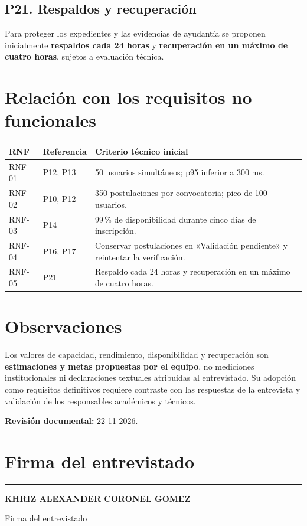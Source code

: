 \documentclass[12pt,a4paper]{article}
\begin{document}
\subsection{P21. Respaldos y recuperación}
Para proteger los expedientes y las evidencias de ayudantía se proponen inicialmente \textbf{respaldos cada 24 horas} y \textbf{recuperación en un máximo de cuatro horas}, sujetos a evaluación técnica.

\section{Relación con los requisitos no funcionales}
\noindent\begin{tabularx}{\textwidth}{@{}p{1.5cm}p{2.6cm}X@{}}
\toprule
\textbf{RNF} & \textbf{Referencia} & \textbf{Criterio técnico inicial} \\
\midrule
RNF-01 & P12, P13 & 50 usuarios simultáneos; p95 inferior a 300 ms. \\
RNF-02 & P10, P12 & 350 postulaciones por convocatoria; pico de 100 usuarios. \\
RNF-03 & P14 & 99\,\% de disponibilidad durante cinco días de inscripción. \\
RNF-04 & P16, P17 & Conservar postulaciones en «Validación pendiente» y reintentar la verificación. \\
RNF-05 & P21 & Respaldo cada 24 horas y recuperación en un máximo de cuatro horas. \\
\bottomrule
\end{tabularx}

\section{Observaciones}
Los valores de capacidad, rendimiento, disponibilidad y recuperación son \textbf{estimaciones y metas propuestas por el equipo}, no mediciones institucionales ni declaraciones textuales atribuidas al entrevistado. Su adopción como requisitos definitivos requiere contraste con las respuestas de la entrevista y validación de los responsables académicos y técnicos.

\textbf{Revisión documental:} 22-11-2026.

\needspace{4.5cm}
\section{Firma del entrevistado}
\vspace{1.25cm}
\noindent\rule{8.5cm}{0.35pt}\par
\textbf{KHRIZ ALEXANDER CORONEL GOMEZ}\par
Firma del entrevistado
\end{document}
